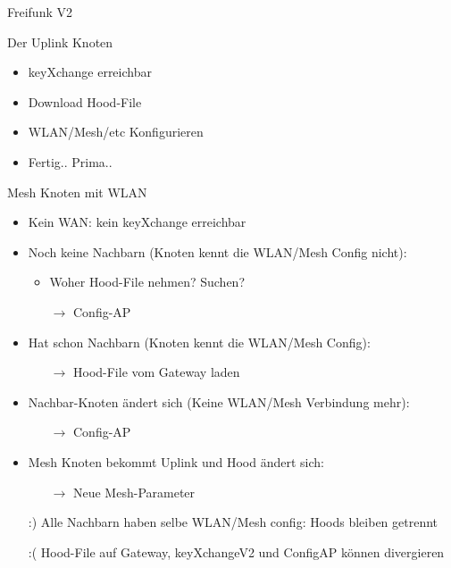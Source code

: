 \begin{frame}{Freifunk V2}
    \center
\end{frame}

\begin{frame}{Der Uplink Knoten}
    \begin{itemize}
        \item keyXchange erreichbar
        \item Download Hood-File
        \item WLAN/Mesh/etc Konfigurieren
        \item Fertig.. Prima..
    \end{itemize}
\end{frame}

\begin{frame}{Mesh Knoten mit WLAN}
    \begin{itemize}
        \item Kein WAN: kein keyXchange erreichbar
        \item Noch keine Nachbarn (Knoten kennt die WLAN/Mesh Config nicht):
        \begin{itemize}
            \item Woher Hood-File nehmen? Suchen?
            \item[$\rightarrow$] Config-AP
        \end{itemize}
        \item Hat schon Nachbarn (Knoten kennt die WLAN/Mesh Config):
        \begin{itemize}
            \item[$\rightarrow$] Hood-File vom Gateway laden
        \end{itemize}
        \item Nachbar-Knoten ändert sich (Keine WLAN/Mesh Verbindung mehr):
        \begin{itemize}
            \item[$\rightarrow$] Config-AP
        \end{itemize}
        \item Mesh Knoten bekommt Uplink und Hood ändert sich:
        \begin{itemize}
            \item[$\rightarrow$] Neue Mesh-Parameter
        \end{itemize}
        \item[:)] Alle Nachbarn haben selbe WLAN/Mesh config: Hoods bleiben getrennt
        \item[:(] Hood-File auf Gateway, keyXchangeV2 und ConfigAP können divergieren
    \end{itemize}
\end{frame}

